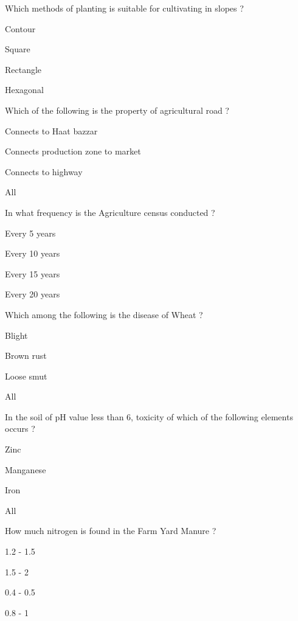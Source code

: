 \begin{questions}
\question Which methods of planting is suitable for cultivating in slopes ?
\begin{items}
\item* Contour
\item Square
\item Rectangle
\item Hexagonal
\end{items}

\question Which of the following is the property of agricultural road ?
\begin{items}
\item Connects to Haat bazzar
\item* Connects production zone to market
\item Connects to highway
\item All
\end{items}

\question In what frequency is the Agriculture census conducted ?
\begin{items}
\item Every 5 years
\item* Every 10 years
\item Every 15 years
\item Every 20 years
\end{items}

\question Which among the following is the disease of Wheat ?
\begin{items}
\item Blight
\item Brown rust
\item Loose smut
\item* All
\end{items}

\question In the soil of pH value less than 6, toxicity of which of the following elements occurs ?
\begin{items}
\item Zinc
\item Manganese
\item Iron
\item* All
\end{items}

\question How much nitrogen is found in the Farm Yard Manure ?
\begin{items}
\item 1.2 - 1.5
\item 1.5 - 2
\item* 0.4 - 0.5
\item 0.8 - 1
\end{items}


\end{questions}
